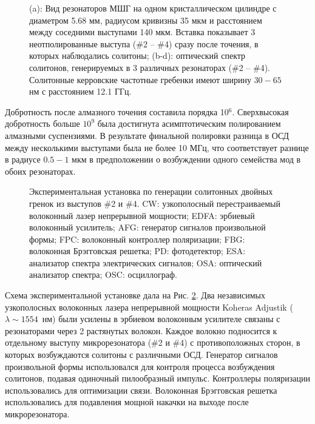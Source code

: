 \begin{figure}[ht]
\begin{minipage}[ht]{1\linewidth}
\end{minipage}
\caption{ (a): Вид резонаторов МШГ на одном кристаллическом цилиндре с диаметром 5.68 мм, радиусом кривизны 35 мкм и расстоянием между соседними выступами 140 мкм. Вставка показывает 3 неотполированные выступа (\#2 -- \#4) сразу после точения, в которых наблюдались солитоны; (b-d): оптический спектр солитонов, генерируемых в 3 различных резонаторах (\#2 -- \#4). Солитонные керровские частотные гребенки имеют ширину $30 - 65$ нм с расстоянием 12.1 ГГц.}
\label{ris:image1}
\end{figure}

Добротность после алмазного точения составила порядка 10$^6$. Сверхвысокая добротность больше $10^9$ была достигнута асимптотическим полированием алмазными суспензиями. В результате финальной полировки разница в ОСД между несколькими выступами была не более 10 МГц, что соответствует разнице в радиусе $0.5 - 1$ мкм в предположении о возбуждении одного семейства мод в обоих резонаторах.

\begin{figure}[ht]
\begin{minipage}[ht]{1\linewidth}
\end{minipage}
\caption{Экспериментальная установка по генерации солитонных двойных гренок из выступов \#2 и \#4. CW: узкополосный перестраиваемый волоконный лазер непрерывной мощности; EDFA: эрбиевый волоконный усилитель; AFG: генератор сигналов произвольной формы; FPC:  волоконный контроллер поляризации; FBG: волоконная Брэгговская решетка; PD: фотодетектор; ESA: анализатор спектра электрических сигналов; OSA: оптический анализатор спектра; OSC: осциллограф.}
\label{ris:image2}
\end{figure}

Схема экспериментальной установке дала на Рис. \ref{ris:image2}.  Два независимых узкополосных волоконных лазера непрерывной мощности Koheras Adjustik ($\lambda \sim 1554$~нм) были усилены в эрбиевом волоконным усилителе связаны с резонаторами через 2 растянутых волокон. Каждое волокно подносится к отдельному выступу микрорезонатора (\#2 и \#4) с противоположных сторон, в которых возбуждаются солитоны с различными ОСД. Генератор сигналов произвольной формы использовался для контроля процесса возбуждения солитонов, подавая одиночный пилообразный импульс. Контроллеры поляризации использовались для оптимизации связи. Волоконная Брэгговская решетка использовались для подавления мощной накачки на выходе после микрорезонатора.

